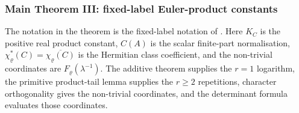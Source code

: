 \documentclass[11pt,a4paper]{amsart}
\theoremstyle{plain}
\theoremstyle{definition}
\theoremstyle{remark}
\begin{document}
\subsubsection{Main Theorem III: fixed-label Euler-product constants}
\label{subsubsec:main-iii-fixed-label-products}

The notation in the theorem is the fixed-label notation of
.  Here \(K_C\) is the positive
real product constant, \(C(A)\) is the scalar finite-part normalisation,
\(\chi_\varrho^\ast(C)=\overline{\chi_\varrho(C)}\) is the Hermitian class
coefficient, and the non-trivial coordinates are
\(F_\varrho(\lambda^{-1})\).  The additive theorem supplies the \(r=1\)
logarithm, the primitive product-tail lemma supplies the \(r\ge2\)
repetitions, character orthogonality gives the non-trivial coordinates, and the
determinant formula evaluates those coordinates.
\end{document}
